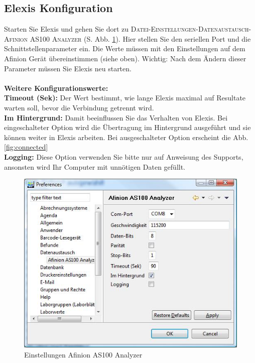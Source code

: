 \documentclass[a4paper]{scrartcl}
\begin{document}
\subsection{Elexis Konfiguration}
Starten Sie Elexis und gehen Sie dort zu \textsc{Datei-Einstellungen-Datenaustausch- Afinion AS100 Analyzer} (S. Abb. \ref{fig:config}).
Hier stellen Sie den seriellen Port und die Schnittstellenparameter ein. Die Werte m\"ussen mit den Einstellungen auf dem Afinion Ger\"at \"ubereinstimmen (siehe oben). Wichtig: Nach dem \"Andern dieser Parameter m\"ussen Sie Elexis neu starten.\\
\\
\textbf{Weitere Konfigurationswerte:}\\
\textbf{Timeout (Sek):} Der Wert bestimmt, wie lange Elexis maximal auf Resultate warten soll, bevor die Verbindung getrennt wird.\\
\textbf{Im Hintergrund:} Damit beeinflussen Sie das Verhalten von Elexis. Bei eingeschalteter Option wird die \"Ubertragung im Hintergrund ausgef\"uhrt und sie k\"onnen weiter in Elexis arbeiten. Bei ausgeschalteter Option erscheint die Abb. \ref{fig:connected}\\
\textbf{Logging:} Diese Option verwenden Sie bitte nur auf Anweisung des Supports, ansonsten wird Ihr Computer mit unn\"otigen Daten gef\"ullt.\\
\begin{figure}[h]
    \includegraphics{config}
    \caption{Einstellungen Afinion AS100 Analyzer}
    \label{fig:config}
\end{figure}
\pagebreak
\end{document}
